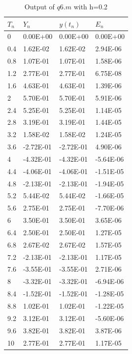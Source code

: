 \documentclass[10pt,a4paper]{report}
\begin{document}
%
\hspace{0.8cm}%
\begin{minipage}[rh]{0.45\linewidth}
\begin{table}[H]
\centering
\begin{tabular}{|l|l|l|l|}
\hline
$T_n$ & $Y_n$      & $y(t_n)$   & $E_n$      \\ \hline
0    & 0.00E+00  & 0.00E+00  & 0.00E+00  \\ \hline
0.4  & 1.62E-02  & 1.62E-02  & 2.94E-06  \\ \hline
0.8  & 1.07E-01  & 1.07E-01  & 1.58E-06  \\ \hline
1.2  & 2.77E-01  & 2.77E-01  & 6.75E-08  \\ \hline
1.6  & 4.63E-01  & 4.63E-01  & 1.39E-06  \\ \hline
2    & 5.70E-01  & 5.70E-01  & 5.91E-06  \\ \hline
2.4  & 5.25E-01  & 5.25E-01  & 1.14E-05  \\ \hline
2.8  & 3.19E-01  & 3.19E-01  & 1.44E-05  \\ \hline
3.2  & 1.58E-02  & 1.58E-02  & 1.24E-05  \\ \hline
3.6  & -2.72E-01 & -2.72E-01 & 4.90E-06  \\ \hline
4    & -4.32E-01 & -4.32E-01 & -5.64E-06 \\ \hline
4.4  & -4.06E-01 & -4.06E-01 & -1.51E-05 \\ \hline
4.8  & -2.13E-01 & -2.13E-01 & -1.94E-05 \\ \hline
5.2  & 5.44E-02  & 5.44E-02  & -1.66E-05 \\ \hline
5.6  & 2.75E-01  & 2.75E-01  & -7.70E-06 \\ \hline
6    & 3.50E-01  & 3.50E-01  & 3.65E-06  \\ \hline
6.4  & 2.50E-01  & 2.50E-01  & 1.27E-05  \\ \hline
6.8  & 2.67E-02  & 2.67E-02  & 1.57E-05  \\ \hline
7.2  & -2.13E-01 & -2.13E-01 & 1.17E-05  \\ \hline
7.6  & -3.55E-01 & -3.55E-01 & 2.71E-06  \\ \hline
8    & -3.32E-01 & -3.32E-01 & -6.94E-06 \\ \hline
8.4  & -1.52E-01 & -1.52E-01 & -1.28E-05 \\ \hline
8.8  & 1.02E-01  & 1.02E-01  & -1.22E-05 \\ \hline
9.2  & 3.12E-01  & 3.12E-01  & -5.60E-06 \\ \hline
9.6  & 3.82E-01  & 3.82E-01  & 3.87E-06  \\ \hline
10   & 2.77E-01  & 2.77E-01  & 1.17E-05  \\ \hline
\end{tabular}%
\caption{Output of $q6.m$ with h=0.2}%
\end{table}%
\end{minipage}%
\end{document}
